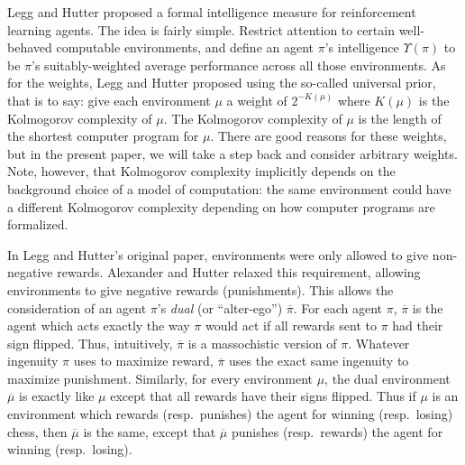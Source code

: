 \documentclass[runningheads]{llncs}
\begin{document}
Legg and Hutter proposed a formal intelligence measure for reinforcement learning agents.
The idea is fairly simple. Restrict attention to certain well-behaved computable
environments, and define an agent $\pi$'s intelligence $\Upsilon(\pi)$ to
be $\pi$'s suitably-weighted
average performance across all those environments. As for the weights, Legg and
Hutter proposed using the so-called universal prior, that is to say: give each environment
$\mu$ a weight of $2^{-K(\mu)}$ where $K(\mu)$ is the Kolmogorov complexity of $\mu$. The
Kolmogorov complexity of $\mu$ is the length of the shortest computer program for
$\mu$. There are good reasons for these weights, but in the present paper,
we will take a step back and consider arbitrary weights.
Note, however, that Kolmogorov
complexity implicitly depends on the background choice of a model of computation: the same
environment could have a different Kolmogorov complexity depending on how computer programs
are formalized.

In Legg and Hutter's original paper, environments were only allowed to give
non-negative rewards.
Alexander and Hutter relaxed this requirement, allowing environments to give negative
rewards (punishments). This allows the consideration of an
agent $\pi$'s \emph{dual} (or ``alter-ego'') $\overline\pi$.
For each agent $\pi$, $\overline\pi$ is the agent which acts exactly the way $\pi$ would
act if all rewards sent to $\pi$ had their sign flipped. Thus, intuitively, $\overline\pi$
is a massochistic version of $\pi$. Whatever ingenuity $\pi$
uses to maximize reward, $\overline\pi$ uses the exact same ingenuity to maximize
punishment. Similarly, for every environment $\mu$, the dual environment $\overline\mu$
is exactly like $\mu$ except that all rewards have their signs flipped. Thus if $\mu$ is
an environment which rewards (resp.\ punishes) the agent for winning (resp.\ losing) chess,
then $\overline\mu$ is the same, except that $\overline\mu$
punishes (resp.\ rewards) the agent for winning (resp.\ losing).
\end{document}
